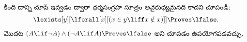 \documentclass[../../../include/open-logic-section]{subfiles}
\begin{document}
\begin{prob}
కింది దాన్ని చూపే  ఇవ్వడం ద్వారా ధర్మసంగ్రహ సూత్రం
అవైరుధ్యమైనది కాదని చూపండి:
\[
\lexists[y][\lforall[x][(x \in y \liff x \notin x)]] \Proves \lfalse.
\]
మొదట $(A \lif \lnot A) \land (\lnot A \lif A)
\Proves \lfalse$ అని చూపడం ఉపయోగపడవచ్చు.
\end{prob}
\end{document}
